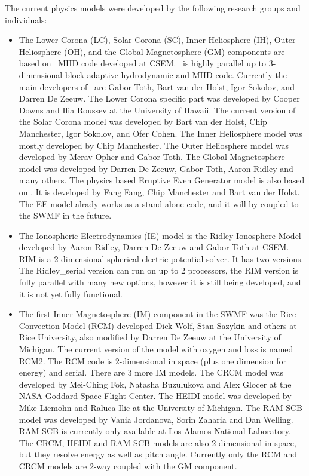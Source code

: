 The current physics 
models were developed by the following research groups
and individuals:
\begin{itemize}
\item
The Lower Corona (LC), Solar Corona (SC), Inner Heliosphere (IH), 
Outer Heliosphere (OH), and the Global Magnetosphere (GM) 
components are based on \BATSRUS\ MHD code developed at CSEM. 
\BATSRUS\ is highly parallel up to 3-dimensional block-adaptive 
hydrodynamic and MHD code. 
Currently the main developers of \BATSRUS\ are Gabor Toth,
Bart van der Holst, Igor Sokolov, and Darren De Zeeuw.
The Lower Corona specific part was developed by
Cooper Downs and Ilia Roussev at the University of Hawaii.
The current version of the Solar Corona model was developed
by Bart van der Holst, Chip Manchester, Igor Sokolov, and Ofer Cohen. 
The Inner Heliosphere model was mostly developed by Chip Manchester.
The Outer Heliosphere model was developed by Merav Opher and Gabor
Toth. The Global Magnetosphere model was developed by 
Darren De Zeeuw, Gabor Toth, Aaron Ridley and many others.
The physics based Eruptive Even Generator model is also based on
\BATSRUS. It is developed by Fang Fang, Chip Manchester and Bart van
der Holst. The EE model alrady works as a stand-alone code, and
it will by coupled to the SWMF in the future.

\item
The Ionospheric Electrodynamics (IE) model is the Ridley Ionosphere Model
developed by Aaron Ridley, Darren De Zeeuw and Gabor Toth at CSEM.
RIM  is a 2-dimensional spherical electric potential solver.
It has two versions. The Ridley\_serial version can run on up to 2 processors,
the RIM version is fully parallel with many new options, however it is still
being developed, and it is not yet fully functional.

\item
The first Inner Magnetosphere (IM) component in the SWMF was
the Rice Convection Model (RCM) developed Dick Wolf, Stan Sazykin and 
others at Rice University, also modified by Darren De Zeeuw at the
University of Michigan. The current version of the model with oxygen and loss
is named RCM2. The RCM code is 2-dimensional in space 
(plus one dimension for energy) and serial. There are 3 more IM models.
The CRCM model was developed by Mei-Ching Fok, Natasha Buzulukova and 
Alex Glocer at the NASA Goddard Space Flight Center.
The HEIDI model was developed by Mike Liemohn and Raluca Ilie 
at the University of Michigan.
The RAM-SCB model was developed by Vania Jordanova, Sorin Zaharia and
Dan Welling. RAM-SCB is currently only available at Los Alamos National
Laboratory. The CRCM, HEIDI and RAM-SCB models are also 2 dimensional
in space, but they resolve energy as well as pitch angle.
Currently only the RCM and CRCM models are 2-way coupled with the
GM component. 


\end{itemize}
